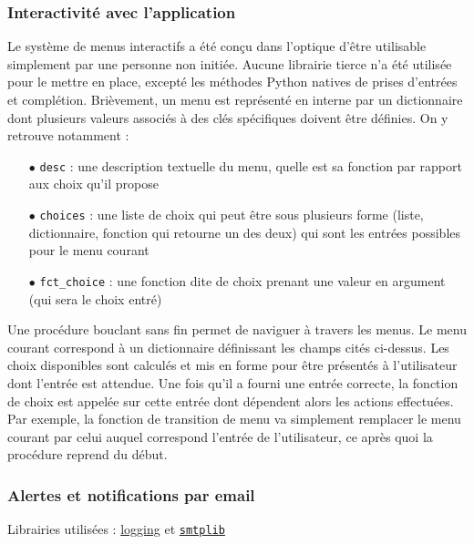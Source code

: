 \documentclass[]{article}
\begin{document}
\subsubsection{Interactivité avec l'application}
\label{justifinter}

Le système de menus interactifs a été conçu dans l'optique d'être utilisable simplement par une personne non initiée. Aucune librairie tierce n'a été utilisée pour le mettre en place, excepté les méthodes Python natives de prises d'entrées et complétion. Brièvement, un menu est représenté en interne par un dictionnaire dont plusieurs valeurs associés à des clés spécifiques doivent être définies. On y retrouve notamment :\\
\begin{itemize}
\item[$\bullet$] \texttt{desc} : une description textuelle du menu, quelle est sa fonction par rapport aux choix qu'il propose
\vspace{0.1cm}
\item[$\bullet$] \texttt{choices} : une liste de choix qui peut être sous plusieurs forme (liste, dictionnaire, fonction qui retourne un des deux) qui sont les entrées possibles pour le menu courant
\vspace{0.1cm}
\item[$\bullet$] \texttt{fct\_choice} : une fonction dite de choix prenant une valeur en argument (qui sera le choix entré)
\end{itemize}
\vspace{0.2cm}

Une procédure bouclant sans fin permet de naviguer à travers les menus. Le menu courant correspond à un dictionnaire définissant les champs cités ci-dessus. Les choix disponibles sont calculés et mis en forme pour être présentés à l'utilisateur dont l'entrée est attendue. Une fois qu'il a fourni une entrée correcte, la fonction de choix est appelée sur cette entrée dont dépendent alors les actions effectuées. Par exemple, la fonction de transition de menu va simplement remplacer le menu courant par celui auquel correspond l'entrée de l'utilisateur, ce après quoi la procédure reprend du début.

\subsubsection{Alertes et notifications par email}

\noindent Librairies utilisées : \href{https://docs.python.org/3/howto/logging.html}{logging} et \href{https://docs.python.org/3/library/smtplib.html}{\texttt{smtplib}}\\
\end{document}
